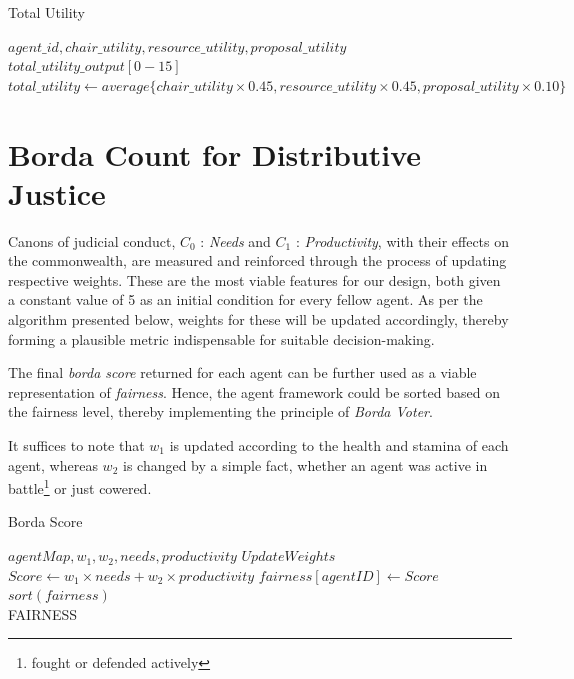 \begin{algorithm}
\caption{Total Utility}\label{alg:4}
\begin{algorithmic} 
\scriptsize
\Require $agent\_id, chair\_utility, resource\_utility, proposal\_utility$
\Ensure $total\_utility\_output[0-15]$
\State $total\_utility \leftarrow average\{chair\_utility \times 0.45, resource\_utility \times 0.45, proposal\_utility \times 0.10\}$
\EndIf
\end{algorithmic}
\end{algorithm}

\clearpage

\section{Borda Count for Distributive Justice }

Canons of judicial conduct, $C_0$ : \textit{Needs} and $C_1$ : \textit{Productivity}, with their effects on the commonwealth, are measured and reinforced through the process of updating respective weights. These are the most viable features for our design, both given a constant value of 5 as an initial condition for every fellow agent. As per the algorithm presented below, weights for these will be updated accordingly, thereby forming a plausible metric indispensable for suitable decision-making.

The final \textit{borda score} returned for each agent can be further used as a viable representation of \textit{fairness}. Hence, the agent framework could be sorted based on the fairness level, thereby implementing the principle of \textit{Borda Voter}.

It suffices to note that $w_1$ is updated according to the health and stamina of each agent, whereas $w_2$ is changed by a simple fact, whether an agent was active in battle\footnote{fought or defended actively} or just cowered.



\begin{algorithm}
\caption{Borda Score}\label{alg:5}
\begin{algorithmic} 
\scriptsize
\Require $agentMap, w_1, w_2, needs, productivity$
\State $Update Weights$
\State $Score \leftarrow w_1 \times needs + w_2 \times productivity$
\State $fairness[agentID] \leftarrow Score$
\EndWhile
\State $sort(fairness)$\\
\Return FAIRNESS
\end{algorithmic}
\end{algorithm}

